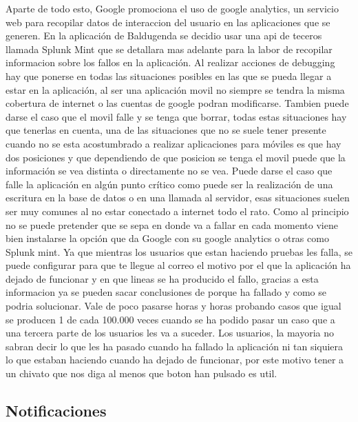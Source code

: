 Aparte de todo esto, Google promociona el uso de google analytics, un servicio web para recopilar datos de interaccion del usuario en las aplicaciones que se generen.
En la aplicación de Baldugenda se decidio usar una api de teceros llamada Splunk Mint que se detallara mas adelante para la labor de recopilar informacion sobre los fallos en la aplicación.
 Al realizar acciones de debugging hay que ponerse en todas las situaciones posibles en las que se pueda llegar a estar en la aplicación, al ser una aplicación movil no siempre se tendra la misma cobertura de internet o las cuentas de google podran modificarse.
Tambien puede darse el caso que el movil falle y se tenga que borrar,  todas estas situaciones hay que tenerlas en cuenta, una de las situaciones que no se suele tener presente cuando no se esta acostumbrado a realizar aplicaciones para móviles es que hay dos posiciones y que dependiendo de que posicion se tenga el movil puede que la información se vea distinta o directamente no se vea.
Puede darse el caso que falle la aplicación en algún punto crítico como puede ser la realización de una escritura en la base de datos o en una llamada al servidor, esas situaciones suelen ser muy comunes al no estar conectado a internet  todo el rato.
Como al principio no se puede pretender que se sepa en donde va a fallar en cada momento viene bien instalarse la opción que da Google con su google analytics o otras como Splunk mint.
Ya que mientras los usuarios que estan haciendo pruebas les falla, se puede configurar para que te llegue al correo el motivo por el que la aplicación ha dejado de funcionar y en que  lineas se ha producido el fallo, gracias a esta informacion ya se pueden sacar conclusiones de porque ha fallado y como se podria solucionar. Vale de poco pasarse horas y horas probando casos que igual se producen 1 de cada 100.000 veces cuando se ha podido pasar un caso que a una tercera parte de los usuarios les va a suceder.
Los usuarios, la mayoria no sabran decir lo que les ha pasado cuando ha fallado la aplicación ni tan siquiera lo que estaban haciendo cuando ha dejado de funcionar, por este motivo tener a un chivato que nos diga al menos que boton han pulsado es util.
 


\subsection{Notificaciones}
\label{subsecc:Notificaciones}

